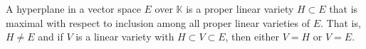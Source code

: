 A hyperplane in a vector space $E$ over $\mathbb{K}$ is a proper linear variety $H \subset E$ that is maximal with respect to inclusion among all proper linear varieties of $E$. That is, $H \neq E$ and if $V$ is a linear variety with $H \subset V \subset E$, then either $V = H$ or $V = E$.

